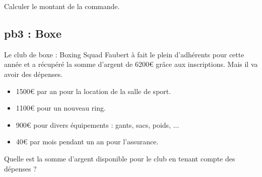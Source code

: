 Calculer le montant de la commande.

\subsection*{pb3 : Boxe} 

Le club de boxe : Boxing Squad Faubert à fait le plein d'adhérents pour cette année et a récupéré la somme d'argent de 6200€ grâce aux inscriptions. Mais il va avoir des dépenses. 

\begin{itemize}[label={$\bullet$}]
  \item 1500€ par an pour la location de la salle de sport.
  \item 1100€ pour un nouveau ring.
  \item 900€ pour divers équipements : gants, sacs, poids, ...
  \item 40€ par mois pendant un an pour l'assurance. 
\end{itemize}

Quelle est la somme d'argent disponible pour le club en tenant compte des dépenses ?

